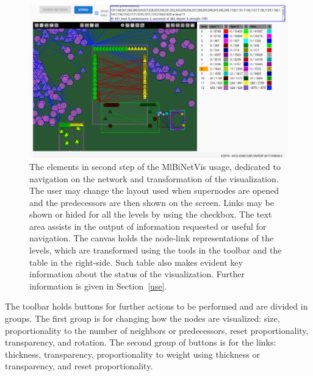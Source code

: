 \documentclass[runningheads]{llncs}
\begin{document}
\begin{figure}\centering
 \includegraphics[width=\textwidth]{secondPhase}
  \caption{The elements in second step of the MlBiNetVis usage, dedicated to navigation on the network and transformation of the visualization.
  The user may change the layout used when supernodes are opened and the predecessors are then shown on the screen.
  Links may be shown or hided for all the levels by using the checkbox.
  The text area assists in the output of information requested or useful for navigation.
  The canvas holds the node-link representations of the levels, which are transformed using the tools in the toolbar and the table in the right-side.
  Such table also makes evident key information about the status of the visualization.
  Further information is given in Section~\ref{use}.
  }\label{secondPhase}
\end{figure}

The toolbar holds buttons for further actions to be performed and are divided in groups.
The first group is for changing how the nodes are visualized: size, proportionality to
the number of neighbors or predecessors, reset proportionality, transparency, and rotation.
The second group of buttons is for the links: thickness, transparency, proportionality to weight
using thickness or transparency, and reset proportionality.
\end{document}

